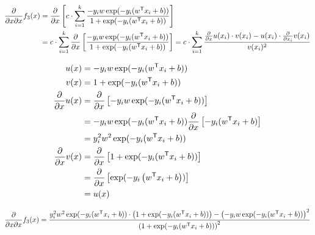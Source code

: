 \documentclass[12pt,landscape]{article}
\newcommand{\tr}{^\mathsf{T}}
\begin{document}
\begin{align*}
\frac{\partial}{\partial x \partial x} f_3(x) &= \frac{\partial}{\partial x}\left[ c \cdot \sum\limits_{i=1}^k \frac{\dLogz}{\dLogn}  \right] \\
&= c \cdot \sum\limits_{i=1}^k \frac{\partial}{\partial x} \left[  \frac{\dLogz}{\dLogn}  \right] = c \cdot \sum\limits_{i=1}^k \frac{ \frac{\partial}{\partial x} u(x_i) \cdot v(x_i) - u(x_i) \cdot \frac{\partial}{\partial x_i} v(x_i)} {v(x_i)^2}\\
\end{align*}





\begin{align*}
u(x) &= \dLogz\\
v(x) &= \dLogn\\
\frac{\partial}{\partial x} u(x) &= \frac{\partial}{\partial x} \left[\dLogz \right]\\
 &= -y_i w \exp(-y_i(w\tr x_i + b)) \frac{\partial}{\partial x} \left[ -y_i(w\tr x_i + b) \right] \\
&= y_i^2 w^2 \exp(-y_i(w\tr x_i + b)) \\  
\frac{\partial}{\partial x}  v(x) &= \frac{\partial}{\partial x} \left[  \dLogn \right] \\ 
&= \frac{\partial}{\partial x} \left[\exp(-y_i\left(w\tr x_i + b \right)) \right] \\ 
&= u(x)
\end{align*}

\begin{align*}
\frac{\partial}{\partial x \partial x} f_3(x) &= \frac{ y_i^2 w^2 \exp(-y_i(w\tr x_i + b)) \cdot \left(\dLogn\right) - \left( \dLogz \right)^2 } {\left(\dLogn\right)^2}\\
\end{align*}








\end{document}
